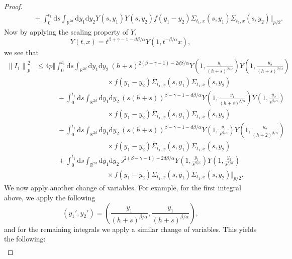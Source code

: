 \documentclass[a4paper,11pt]{article}
\numberwithin{equation}{section}
\theoremstyle{plain}
\theoremstyle{definition}
\newcommand{\ud}{\ensuremath{\mathrm{d} }}
\newcommand{\Norm}[1]{\left\|  #1   \right\|}
\newcommand{\R}{\mathbb{R}}
\numberwithin{NQ}{section}
\numberwithin{LQ}{section}
\numberwithin{ZQ}{section}
\begin{document}
\begin{proof}
\begin{align*}
                   & \qquad \quad + \int_0^{t_1} \ud s \int_{\R^{2d}} \ud y_1 \ud y_2 Y(s, y_1) Y( s, y_2) f(y_1 - y_2) \Sigma_{t_1, x}(s,y_1)  \Sigma_{t_1, x}(s,y_2) \bigg\Vert_{p/2}.
  \end{align*}
  Now by applying the scaling property of $Y$,
    \[
      Y(t,x) = t^{\beta + \gamma - 1 - d\beta / \alpha}Y(1,t^{-\beta / \alpha}x),
    \]
  we see that
 \begin{align*}
   \Norm{I_1}_p^2 &\le 4p \bigg\Vert
   \int_0^{t_1} \ud s \int_{\R^{2d}} \ud y_1 \ud y_2 \: (h+s)^{2(\beta - \gamma - 1) - 2d\beta / \alpha} Y\left(1, \frac{y_1}{(h + s)^{\beta/\alpha}}\right) Y\left(1, \frac{y_2}{(h + s)^{\beta/\alpha}}\right) \\
   & \hspace{10em} \times f(y_1 - y_2) \Sigma_{t_1, x}(s,y_1)  \Sigma_{t_1, x}(s,y_2)\\
   & \qquad \quad - \int_0^{t_1} \ud s \int_{\R^{2d}} \ud y_1 \ud y_2 \: (s(h+s))^{\beta - \gamma - 1 - d\beta / \alpha} Y\left(1, \frac{y_1}{(h + s)^{\beta/\alpha}}\right) Y\left(1, \frac{y_2}{ s^{\beta/\alpha}}\right) \\
   & \hspace{10em} \times f(y_1 - y_2) \Sigma_{t_1, x}(s,y_1)  \Sigma_{t_1, x}(s,y_2)\\
   & \qquad \quad - \int_0^{t_1} \ud s \int_{\R^{2d}} \ud y_1 \ud y_2 \: (s(h+s))^{\beta - \gamma - 1 - d\beta /\alpha} Y\left(1, \frac{y_1}{ s^{\beta/\alpha}}\right) Y\left(1, \frac{y_2}{ (h+2)^{\beta/\alpha}}\right) \\
   & \hspace{10em} \times f(y_1 - y_2) \Sigma_{t_1, x}(s,y_1)  \Sigma_{t_1, x}(s,y_2)\\
   & \qquad \quad + \int_0^{t_1} \ud s \int_{\R^{2d}} \ud y_1 \ud y_2 \: s^{2(\beta - \gamma - 1) -2d\beta / \alpha} Y\left(1, \frac{y_1}{s^{\beta/\alpha}}\right) Y\left(1, \frac{y_2}{ s^{\beta/\alpha}}\right) \\
   & \hspace{10em} \times f(y_1 - y_2) \Sigma_{t_1, x}(s,y_1)  \Sigma_{t_1, x}(s,y_2)
   \bigg\Vert_{p/2}.
 \end{align*}
  We now apply another change of variables. For example, for the first integral above, we apply the
  following
  \[
    (y_1', y_2') = \left( \frac{y_1}{(h+s)^{\beta / \alpha}}, \frac{y_1}{(h+s)^{\beta / \alpha}}\right),
  \]
  and for the remaining integrals we apply a similar change of variables. This yields the following:
  \begin{align*}

\end{align*}
\end{proof}
\end{document}
